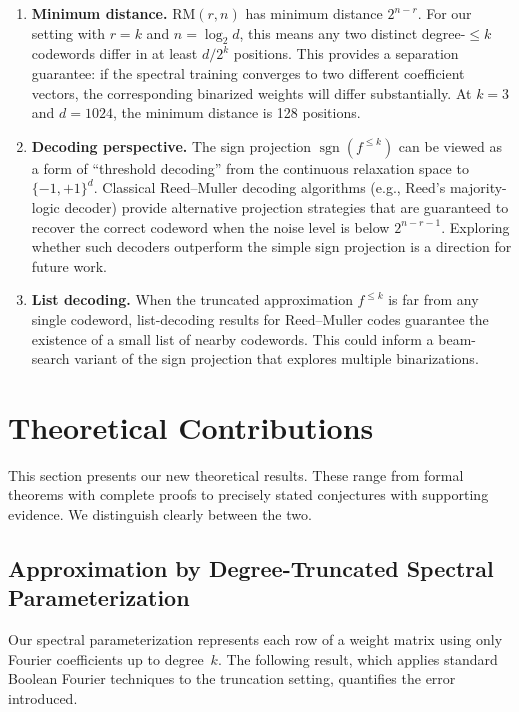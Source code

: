 \documentclass[12pt,a4paper]{article}
\theoremstyle{plain}
\theoremstyle{definition}
\theoremstyle{remark}
\newcommand{\pmone}{\{-1,+1\}}
\newcommand{\sgn}{\operatorname{sgn}}
\begin{document}
\begin{enumerate}[label=(\roman*)]
    \item \textbf{Minimum distance.} $\text{RM}(r, n)$ has minimum distance $2^{n-r}$. For our setting with $r = k$ and $n = \log_2 d$, this means any two distinct degree-$\leq k$ codewords differ in at least $d / 2^k$ positions. This provides a separation guarantee: if the spectral training converges to two different coefficient vectors, the corresponding binarized weights will differ substantially. At $k = 3$ and $d = 1024$, the minimum distance is 128 positions.
    \item \textbf{Decoding perspective.} The sign projection $\sgn(f^{\leq k})$ can be viewed as a form of ``threshold decoding'' from the continuous relaxation space to $\pmone^d$. Classical Reed--Muller decoding algorithms (e.g., Reed's majority-logic decoder) provide alternative projection strategies that are guaranteed to recover the correct codeword when the noise level is below $2^{n-r-1}$. Exploring whether such decoders outperform the simple sign projection is a direction for future work.
    \item \textbf{List decoding.} When the truncated approximation $f^{\leq k}$ is far from any single codeword, list-decoding results for Reed--Muller codes guarantee the existence of a small list of nearby codewords. This could inform a beam-search variant of the sign projection that explores multiple binarizations.
\end{enumerate}


\newpage
\section{Theoretical Contributions}\label{sec:theory}

This section presents our new theoretical results. These range from formal theorems with complete proofs to precisely stated conjectures with supporting evidence. We distinguish clearly between the two.

\subsection{Approximation by Degree-Truncated Spectral Parameterization}\label{sec:approx-bound}

Our spectral parameterization represents each row of a weight matrix using only Fourier coefficients up to degree~$k$. The following result, which applies standard Boolean Fourier techniques to the truncation setting, quantifies the error introduced.
\end{document}
